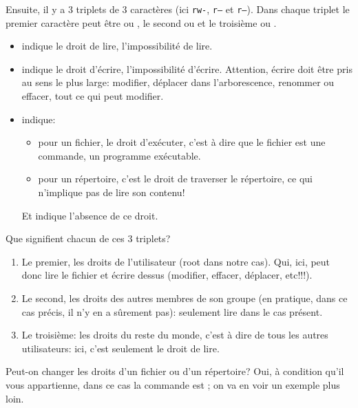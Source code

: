 Ensuite, il y a 3 triplets de 3 caractères (ici \texttt{rw-},
\texttt{r---} et \texttt{r---}).
Dans chaque triplet le
premier caractère peut être  ou \ttt{-}, le second   ou \ttt{-} et
le troisième  ou \ttt{-}.

\begin{itemize}
  \item {} indique le droit de lire, \ttt{-} l'impossibilité de
    lire.
  \item {} indique le droit d'écrire, \ttt{-} l'impossibilité
    d'écrire. Attention, écrire doit être pris au sens le plus large:
    modifier, déplacer dans l'arborescence, renommer ou effacer, tout
    ce qui peut modifier.
  \item {} indique:
    \begin{itemize}
      \item pour un fichier, le droit d'exécuter, c'est à dire que le
        fichier est une  commande, un programme exécutable.
      \item pour un répertoire, c'est le droit de traverser le
        répertoire, ce qui n'implique pas de lire son contenu!
    \end{itemize}
    Et \ttt{-} indique l'absence de ce droit.
\end{itemize}

Que signifient chacun de ces 3 triplets?

\begin{enumerate}
  \item Le premier, les droits de l'utilisateur (root dans notre
    cas). Qui, ici, peut 
    donc lire le fichier et écrire dessus (modifier, effacer,
    déplacer, etc!!!).
  \item Le second, les droits des autres membres de son groupe (en
    pratique, dans ce cas précis, il n'y en a sûrement pas): seulement
    lire dans le   cas présent.
  \item Le troisième: les droits du reste du monde, c'est à dire de
    tous les autres utilisateurs: ici, c'est seulement le droit de lire.
\end{enumerate}

Peut-on changer les droits d'un fichier ou d'un répertoire? Oui, à
condition qu'il vous appartienne, dans ce cas la commande est
; on va en voir un exemple plus loin.

